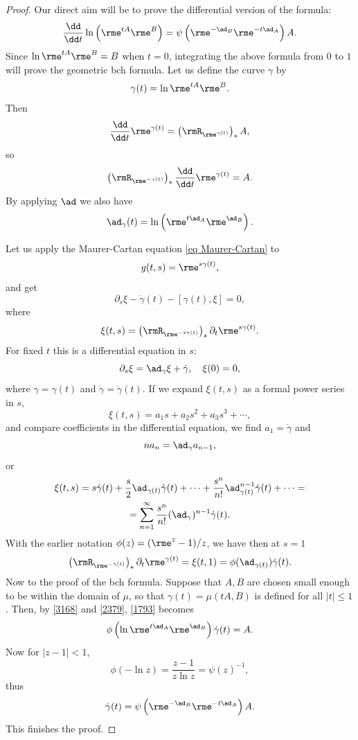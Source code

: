 \begin{proof}
    Our direct aim will be to prove the differential version of the formula:
    \[\frac{\dd}{\dd t}\ln\left(\rme^{tA} \rme^B\right)=\psi\left(\rme^{-\ad_B}\rme^{-t\ad_A}\right)A.\]
    Since $\ln \rme^{tA} \rme^{B}=B$ when $t=0$, integrating the above formula from $0$ to $1$ will prove the geometric \gls{bch} formula. Let us define the curve $\gamma$ by
    \[\gamma(t)=\ln \rme^{tA} \rme^{B}.\]
    Then
    \[\frac{\dd}{\dd t} \rme^{\gamma(t)}=\left(\rmR_{\rme^{\gamma(t)}}\right)_\ast A,\]
    so
    \[\left(\rmR_{\rme^{-\gamma(t)}}\right)_\ast\frac{\dd}{\dd t}\rme^{\gamma(t)}=A.\label{2379}\]
    By applying $\ad$ we also have
    \[\ad_\gamma(t)=\ln\left(\rme^{t\ad_A}\rme^{\ad_{B}}\right).\label{3168}\]
    
    Let us apply the Maurer-Cartan equation \eqref{eq Maurer-Cartan} to
    \[g(t,s)=\rme^{s\gamma(t)},\]
    and get 
    \[\partial_s \xi-\dot\gamma(t)-[\gamma(t),\xi]=0,\]
    where 
    \[\xi(t,s)=\left(\rmR_{\rme^{-s\gamma(t)}}\right)_\ast\partial_t \rme^{s\gamma(t)}.\]
    For fixed $t$ this is a differential equation in $s$:
    \[\partial_s\xi=\ad_\gamma\xi+\dot\gamma,\quad \xi(0)=0,\]
    where $\gamma=\gamma(t)$ and $\dot\gamma=\dot\gamma(t)$. If we expand $\xi(t,s)$ as a formal power series in $s$,
    \[\xi(t,s)=a_1s+a_2s^2+a_3s^3+\cdots,\]
    and compare coefficients in the differential equation, we find $a_1=\dot\gamma$ and 
    \[na_n=\ad_\gamma a_{n-1},\]
    or 
    \begin{multline}
        \xi(t,s)=s\dot\gamma(t)+\frac{s}{2}\ad_{\gamma(t)}\dot\gamma(t)+\cdots+\frac{s^n}{n!}\ad_{\gamma(t)}^{n-1}\dot\gamma(t)+\cdots=\\=\sum_{n=1}^\infty \frac{s^n}{n!}(\ad_\gamma)^{n-1}\dot\gamma(t).
    \end{multline}
    With the earlier notation $\phi(z)=(\rme^z-1)/z$, we have then at $s=1$
    \[\left(\rmR_{\rme^{-\gamma(t)}}\right)_\ast \partial_t \rme^{\gamma(t)}=\xi(t,1)=\phi(\ad_{\gamma(t)})\dot\gamma(t).\label{1793}\]
    Now to the proof of the \gls{bch} formula. Suppose that $A,B$ are chosen small enough to be within the domain of $\mu$, so that $\gamma(t)=\mu(tA,B)$ is defined for all $|t|\leq 1$. Then, by \eqref{3168} and \eqref{2379}, \eqref{1793} becomes
    \[\phi\left(\ln \rme^{t\ad_A}\rme^{\ad_B}\right)\dot\gamma(t)=A.\]
    Now for $|z-1|<1$,
    \[\phi(-\ln z)=\frac{z-1}{z\ln z}=\psi(z)^{-1},\]
    thus
    \[\dot\gamma(t)=\psi\left(\rme^{-\ad_B}\rme^{-t\ad_A}\right)A.\]
    This finishes the proof.
\end{proof}





